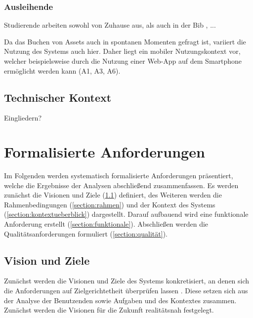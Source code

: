 \subsubsection{Ausleihende}
Studierende arbeiten sowohl von Zuhause aus, als auch in der Bib , ... 

Da das Buchen von Assets auch in spontanen Momenten gefragt ist, variiert die Nutzung des Systems
auch hier. Daher liegt ein mobiler Nutzungskontext vor, welcher beispielsweise durch die Nutzung
einer Web-App auf dem Smartphone ermöglicht werden kann (A1, A3, A6).

\subsection{Technischer Kontext}
Eingliedern?


\section{Formalisierte Anforderungen}
\label{section:anforderung}

Im Folgenden werden systematisch formalisierte Anforderungen präsentiert, welche die Ergebnisse der
Analysen abschließend zusammenfassen. Es werden zunächst die Visionen und Ziele
(\ref{section:visionziel}) definiert, des Weiteren werden die Rahmenbedingungen
(\ref{section:rahmen}) und der Kontext des Systems (\ref{section:kontextueberblick}) dargestellt.
Darauf aufbauend wird eine funktionale Anforderung erstellt (\ref{section:funktionale}). Abschließen
werden die Qualitätsanforderungen formuliert (\ref{section:qualität}).


\subsection{Vision und Ziele}
\label{section:visionziel}
Zunächst werden die Visionen und Ziele des Systems konkretisiert, an denen sich die Anforderungen
auf Zielgerichtetheit überprüfen lassen \cite{balzert2009}. Diese setzen sich aus der Analyse der
Benutzenden sowie Aufgaben und des Kontextes zusammen. Zunächst werden die Visionen für die
Zukunft realitätsnah festgelegt.

